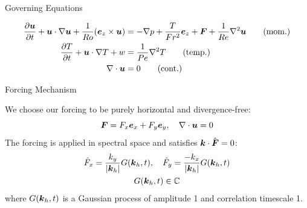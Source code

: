 \documentclass{beamer}
\begin{document}
\begin{frame}{Governing Equations}

    {\small
    \begin{align}
        \frac{\partial \boldsymbol{u}}{\partial t} + \boldsymbol{u} \cdot \nabla \boldsymbol{u} +
        \frac{1}{Ro}(\boldsymbol{e}_z \times
        \boldsymbol{u}) &= -\nabla p +
        \frac{T}{Fr^2}\boldsymbol{e}_z + \boldsymbol{F} + \frac{1}{Re}\nabla^2\boldsymbol{u} \tag{mom.}\label{eq:momentum}\\
        \frac{\partial T}{\partial t} + \boldsymbol{u} \cdot \nabla T + w &= \frac{1}{Pe}\nabla^2T \tag{temp.} \label{eq:temp} \\
        \nabla \cdot \boldsymbol{u} &= 0 \tag{cont.}\label{eq:cont}
    \end{align}}
    

\end{frame}

\begin{frame}{Forcing Mechanism}

    We choose our forcing to be purely horizontal and divergence-free:
    \[
        \boldsymbol{F} = F_x\boldsymbol{e}_x + F_y\boldsymbol{e}_y, \quad \nabla \cdot \boldsymbol{u} = 0
    \]
    The forcing is applied in spectral space and satisfies $\boldsymbol{k} \cdot \hat{\boldsymbol{F}} = 0$:
    \begin{gather*}
        \hat{F}_x = \frac{k_y}{|\boldsymbol{k}_h|}G(\boldsymbol{k}_h,t), \quad \hat{F}_y = \frac{-k_x}{|\boldsymbol{k}_h|}G(\boldsymbol{k}_h,t)\\
        G(\boldsymbol{k}_h,t) \in \mathbb{C}
    \end{gather*}
    where $G(\boldsymbol{k}_h,t)$ is a Gaussian process of amplitude 1 and correlation timescale 1. 

\end{frame}
\end{document}
